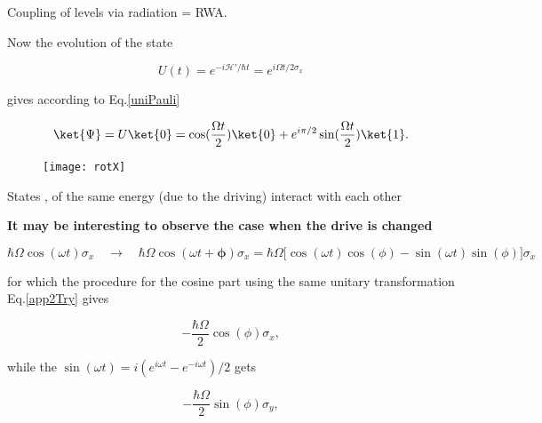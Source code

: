   \begin{center}
    Coupling of levels via radiation = RWA.
  \end{center}

  Now the evolution of the state

  \begin{equation}\label{app2Ev}
    U(t) = e^{-i\mathcal{H'}/\hbar t} = e^{i\Omega t/2\sigma_x}
  \end{equation}

  \noindent gives according to Eq.\eqref{uniPauli}

  \begin{equation}\label{app2State}
    \ket{\Psi} = U\ket{0} = \cos(\frac{\Omega t}{2})\ket{0}+e^{i\pi/2}\sin(\frac{\Omega t}{2})\ket{1}.
  \end{equation}

\begin{figure}[h]
  \centering \texttt{[image: rotX]}
\end{figure}

\noindent

\begin{framed}\noindent
  States  ,   of the  same energy  (due to  the driving)
  interact with each other
\end{framed}
\noindent \textbf{It  may be  interesting to observe  the case  when the
  drive is changed}

  \begin{equation}\label{app2NewPhase}
    \hbar\Omega\cos(\omega t)\sigma_x \quad \rightarrow \quad \hbar\Omega\cos(\omega t+\mathbf{\phi})\sigma_x = \hbar\Omega\bigg[\cos(\omega t)\cos(\phi)-\sin(\omega t)\sin(\phi)\bigg]\sigma_x
  \end{equation}

  \noindent for which  the procedure for the cosine part  using the same
  unitary transformation Eq.\eqref{app2Try} gives

  \begin{equation}\label{app2Cos}
    -\frac{\hbar\Omega}{2}\cos(\phi)\sigma_x,
  \end{equation}

  \noindent                           while                          the
  $ \sin(\omega t) = i(e^{i\omega t}-e^{-i\omega t})/2 $ gets

  \begin{equation}\label{app2Sin}
    -\frac{\hbar\Omega}{2}\sin(\phi)\sigma_y,
  \end{equation}

